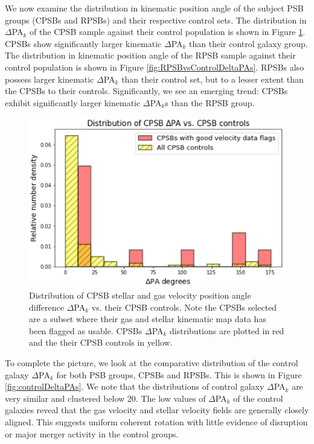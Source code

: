 We now examine the distribution in kinematic position angle of the subject PSB groups (CPSBs and RPSBs) and their respective control sets. The distribution in $\Delta$PA$_{k}$ of the CPSB sample against their control population is shown in Figure \ref{fig:CPSBvsControlDeltaPAs}. CPSBs show significantly larger kinematic $\Delta$PA$_{k}$ than their control galaxy group. The distribution in kinematic position angle of the RPSB sample against their control population is shown in Figure \ref{fig:RPSBvsControlDeltaPAs}. RPSBs also possess larger kinematic $\Delta$PA$_{k}$ than their control set, but to a lesser extent than the CPSBs to their controls. Significantly, we see an emerging trend: CPSBs exhibit significantly larger kinematic $\Delta$PA$_{k}$s than the RPSB group.

\begin{figure}
    \centering
    \includegraphics[width=\columnwidth]{images/JupyterPlots/DIST-DPA-CPSB+FLAGS+controls.png}
    \caption[Distribution of CPSB $\Delta$PA$_{k}$ vs. their CPSB controls]{Distribution of CPSB stellar and gas velocity position angle difference $\Delta$PA$_{k}$ vs. their CPSB controls. Note the CPSBs selected are a subset where their gas and stellar kinematic map data has been flagged as usable. CPSBs $\Delta$PA$_{k}$ distributions are plotted in red and the their CPSB controls in yellow.}
    \label{fig:CPSBvsControlDeltaPAs}
\end{figure}

To complete the picture, we look at the comparative distribution of the control galaxy $\Delta$PA$_{k}$ for both PSB groups, CPSBs and RPSBs. This is shown in Figure \ref{fig:controlDeltaPAs}. We note that the distributions of control galaxy $\Delta$PA$_{k}$ are very similar and clustered below 20\textdegree. The low values of $\Delta$PA$_{k}$ of the control galaxies reveal that the gas velocity and stellar velocity fields are generally closely aligned. This suggests uniform coherent rotation with little evidence of disruption or major merger activity in the control groups.

